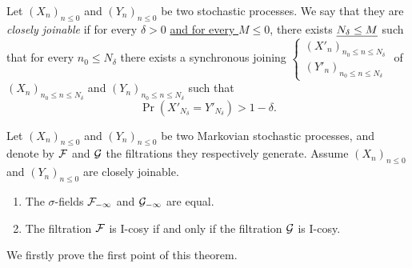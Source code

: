 \documentclass[12pt,a4paper]{article}
\begin{document}

\begin{definition}\label{def:joinable}
Let ${(X_n)}_{n \leq 0}$ and ${(Y_n)}_{n \leq 0}$ be two stochastic processes. 
We say that they are \emph{closely joinable} if for every $\delta >0$ 
\uline{and for every $M\leq 0$}, there exists 
$\uline{N_\delta \leq M}$ such that for every $n_0 \leq N_\delta$ there exists a 
synchronous joining $\left\{\begin{smallmatrix} {(X'_n)}_{n_0 \leq n \leq N_\delta} \\ 
{(Y'_n)}_{n_0 \leq n \leq N_\delta}
\end{smallmatrix}\right.$ 
of ${(X_n)}_{n_0 \leq n \leq N_\delta}$ and ${(Y_n)}_{n_0 \leq n \leq N_\delta}$ 
such that 
$$
\Pr(X'_{N_\delta}=Y'_{N_\delta}) > 1-\delta. 
$$ 
\end{definition}

\begin{thm}\label{thm:joinable}
Let ${(X_n)}_{n \leq 0}$ and ${(Y_n)}_{n \leq 0}$ be two Markovian stochastic processes, and 
denote by $\mathcal{F}$ and $\mathcal{G}$ the filtrations they respectively generate. 
Assume ${(X_n)}_{n \leq 0}$ and ${(Y_n)}_{n \leq 0}$ are closely joinable. 
\begin{enumerate}
\item The $\sigma$-fields $\mathcal{F}_{-\infty}$  and $\mathcal{G}_{-\infty}$ are equal. 

\item The filtration $\mathcal{F}$ is I-cosy if and only if the filtration $\mathcal{G}$ is I-cosy.
\end{enumerate}
\end{thm}

We firstly prove the first point of this theorem. 
\end{document}
